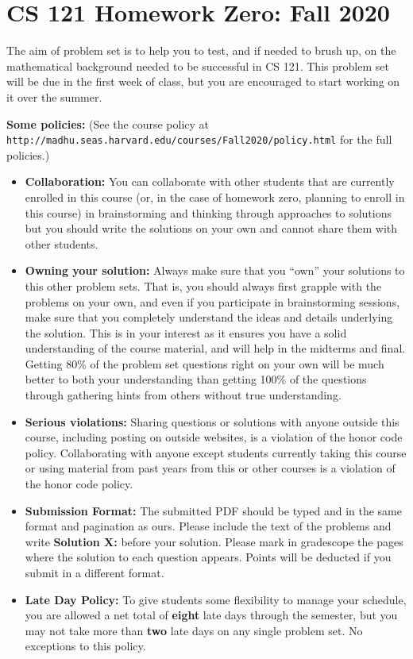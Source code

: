 \documentclass[11pt]{article}
\begin{document}
\section*{CS 121 Homework Zero: Fall
2020}\label{cs-121-homework-zero-fall-2020}

The aim of problem set is to help you to test, and if needed to brush up, on the mathematical
background needed to be successful in CS 121. This problem set will be
due in the first week of class, but you are encouraged to start working on
it over the summer.

\textbf{Some policies:} (See the course policy at  {\tt http://madhu.seas.harvard.edu/courses/Fall2020/policy.html} for the
full policies.)

\begin{itemize}
\item
  {\bf Collaboration:} You can collaborate with other students that are currently enrolled in
  this course (or, in the case of homework zero, planning to enroll in
  this course) in brainstorming and thinking through approaches to
  solutions but you should write the solutions on your own and cannot
  share them with other students. 
\item
  {\bf Owning your solution:} Always make sure that you ``own'' your solutions to this other problem
  sets. That is, you should always first grapple with the problems on
  your own, and even if you participate in brainstorming sessions, make
  sure that you completely understand the ideas and details underlying
  the solution. This is in your interest as it ensures you have a solid
  understanding of the course material, and will help in the midterms
  and final. Getting 80\% of the problem
  set questions right on your own will be much better to both your
  understanding than getting 100\% of the questions through
  gathering hints from others without true understanding.
\item
  {\bf Serious violations:} Sharing questions or solutions with anyone outside this course,
  including posting on outside websites, is a violation of the honor
  code policy. Collaborating with anyone except students currently
  taking this course or using material from past years from this or
  other courses is a violation of the honor code policy.
\item
  {\bf Submission Format:} The submitted PDF should be typed and in the same format and
  pagination as ours. Please include the text of the problems and write
  \textbf{Solution X:} before your solution. Please mark in gradescope 
  the pages where
  the solution to each question appears. Points will be deducted if you
  submit in a different format.
\item {\bf Late Day Policy:} To give students some flexibility to manage your schedule, you are allowed a net total of {\bf eight} late days through the semester, but you may not take more than {\bf two} late days on any single problem set. No exceptions to this policy. 
\end{itemize}
\end{document}
